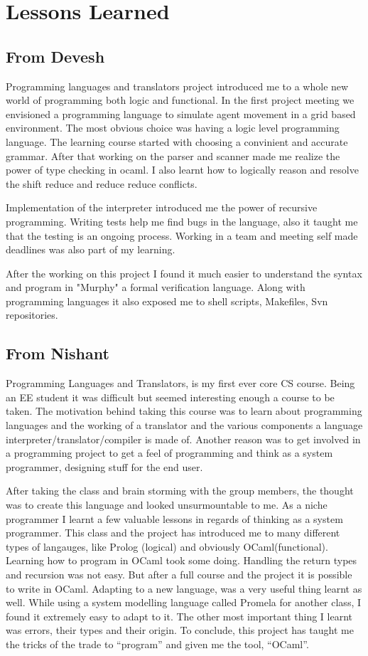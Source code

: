 \documentclass[onecolumn,titlepage]{article}
\begin{document}
\section{Lessons Learned}

\subsection{From Devesh}
Programming languages and translators project introduced me to a whole
new world of programming both logic and functional. In the first
project meeting we envisioned a programming language to simulate agent
movement in a grid based environment. The most obvious choice was
having a logic level programming language. The learning course started
with choosing a convinient and accurate grammar. After that working on
the parser and scanner made me realize the power of type checking in
ocaml. I also learnt how to logically reason and resolve the shift
reduce and reduce reduce conflicts. 

Implementation of the interpreter introduced me the power of recursive
programming. Writing tests help me find bugs in the language, also it
taught me that the testing is an ongoing process. Working in a team
and meeting self made deadlines was also part of my learning. 

After the working on this project I found it much easier to understand
the syntax and program in "Murphy" a formal verification
language. Along with programming languages it also exposed me to shell
scripts, Makefiles, Svn repositories.

\subsection{From Nishant}

Programming Languages and Translators, is my first ever core CS
course. Being an EE student it was difficult but seemed interesting
enough a course to be taken. The motivation behind taking this course
was to learn about programming languages and the working of a
translator and the various components a language
interpreter/translator/compiler is made of. Another reason was to get
involved in a programming project to get a feel of programming and
think as a system programmer, designing stuff for the end user.

After taking the class and brain storming with the group members, the
thought was to create this language and looked unsurmountable to
me. As a niche programmer I learnt a few valuable lessons in regards
of thinking as a system programmer. This class and the project has
introduced me to many different types of langauges, like Prolog
(logical) and obviously OCaml(functional). Learning how to program in
OCaml took some doing. Handling the return types and recursion was not
easy. But after a full course and the project it is possible to write
in OCaml.  Adapting to a new language, was a very useful thing learnt
as well. While using a system modelling language called Promela for
another class, I found it extremely easy to adapt to it. The other
most important thing I learnt was errors, their types and their
origin. To conclude, this project has taught me the tricks of the
trade to ``program'' and given me the tool, ``OCaml''.
\end{document}
